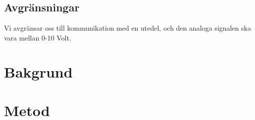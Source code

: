 \documentclass[11pt,a4paper,oneside]{book}
\begin{document}

\section{Avgränsningar}
Vi avgränsar oss till kommunikation med en utedel, och den analoga signalen ska vara mellan 0-10 Volt.\\


\chapter{Bakgrund}

\chapter{Metod}
\end{document}
